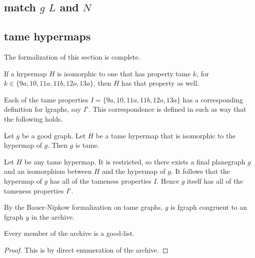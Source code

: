 

\subsection{match $g$ $L$ and $N$}

\subsection{tame hypermaps}

The formalization of this section is complete.

\begin{lemma} 
If a hypermap $H$ is isomorphic to one that has property
tame $k$, for $k\in \{9a, 10, 11a, 11b, 12o, 13a\}$, then
$H$ has that property as well.
\end{lemma} 

Each of the tame properties $I=\{9a,10,11a,11b,12o,13a\}$ has
a corresponding definition for lgraphs, say $I'$.  This correspondence is
defined in such as way that the following holds.

\begin{lemma}  Let $g$ be a good graph.  
Let $H$ be a tame hypermap that is isomorphic to the hypermap of $g$.
Then $g$ is tame.
\end{lemma} 

Let $H$ be any tame hypermap.  It is restricted, so there exists
a final planegraph $g$ and an isomorphism between $H$ and the
hypermap of $g$.  It follows that the hypermap of $g$ has all of
the tameness properties $I$.  Hence $g$ itself has all of the tameness
properties $I'$.  

By the Bauer-Nipkow formalization on tame graphs, $g$ is 
fgraph congruent
to an fgraph $y$ in the archive.

\begin{lemma}
 Every member of the archive 
is a good-list.
\end{lemma} 

\begin{proof} This is by direct enumeration of the archive.
\end{proof}

